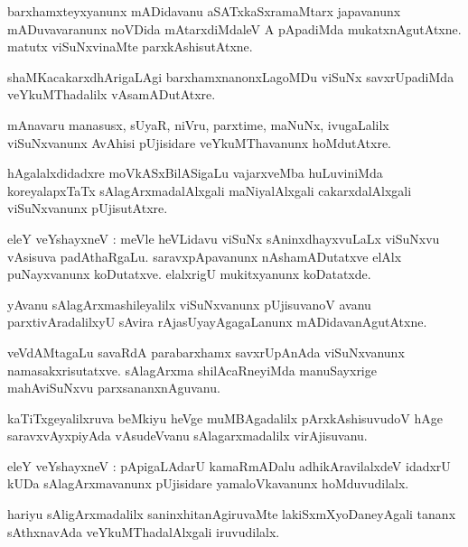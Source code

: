 \documentclass{article}
\begin{document}
\begin{mn}
barxhamxteyxyanunx mADidavanu aSATxkaSxramaMtarx japavanunx mADuvavaranunx noVDida mAtarxdiMdaleV A
pApadiMda mukatxnAgutAtxne. matutx viSuNxvinaMte parxkAshisutAtxne.
\end{mn}

\begin{mn}
shaMKacakarxdhArigaLAgi barxhamxnanonxLagoMDu viSuNx savxrUpadiMda veYkuMThadalilx vAsamADutAtxre.
\end{mn}

\begin{mn}
mAnavaru manasusx, sUyaR, niVru, parxtime, maNuNx, ivugaLalilx viSuNxvanunx AvAhisi pUjisidare 
veYkuMThavanunx hoMdutAtxre.
\end{mn}

\begin{mn}
hAgalalxdidadxre moVkASxBilASigaLu vajarxveMba huLuviniMda koreyalapxTaTx sAlagArxmadalAlxgali 
maNiyalAlxgali cakarxdalAlxgali viSuNxvanunx pUjisutAtxre.
\end{mn}

\begin{mn}
eleY veYshayxneV : meVle heVLidavu viSuNx sAninxdhayxvuLaLx viSuNxvu vAsisuva padAthaRgaLu. 
saravxpApavanunx nAshamADutatxve elAlx puNayxvanunx koDutatxve. elalxrigU mukitxyanunx koDatatxde.
\end{mn}

\begin{mn}
yAvanu sAlagArxmashileyalilx viSuNxvanunx pUjisuvanoV avanu parxtivAradalilxyU sAvira 
rAjasUyayAgagaLanunx mADidavanAgutAtxne.
\end{mn}

\begin{mn}
veVdAMtagaLu savaRdA parabarxhamx savxrUpAnAda viSuNxvanunx namasakxrisutatxve. sAlagArxma 
shilAcaRneyiMda manuSayxrige mahAviSuNxvu parxsananxnAguvanu.
\end{mn}


\begin{mn}
kaTiTxgeyalilxruva beMkiyu heVge muMBAgadalilx pArxkAshisuvudoV hAge saravxvAyxpiyAda vAsudeVvanu 
sAlagarxmadalilx virAjisuvanu.
\end{mn}

\begin{mn}
eleY veYshayxneV : pApigaLAdarU  kamaRmADalu adhikAravilalxdeV idadxrU kUDa sAlagArxmavanunx 
pUjisidare yamaloVkavanunx hoMduvudilalx.
\end{mn}

\begin{mn}
hariyu sAligArxmadalilx saninxhitanAgiruvaMte lakiSxmXyoDaneyAgali tananx sAthxnavAda 
veYkuMThadalAlxgali iruvudilalx.
\end{mn}
\end{document}
